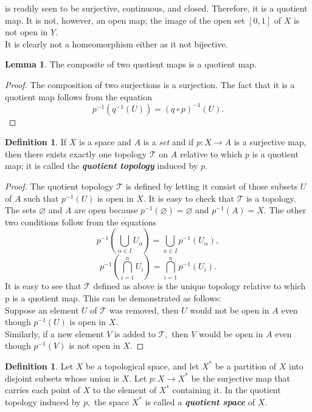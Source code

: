\documentclass{article}
\theoremstyle{definition}
\newtheorem{lem}[theorem]{Lemma}
\newtheorem{defn}[theorem]{Definition}
\let\emptyset\varnothing
\begin{document}
is readily seen to be surjective, continuous, and closed. Therefore, it is a quotient map. It is not, however, an open map; the image of the open set $[0, 1]$ of $X$ is not open in $Y.$\\
It is clearly not a homeomorphism either as it not bijective.
%
\begin{lem} \label{lem:compose quotients}
  The composite of two quotient maps is a quotient map.
\end{lem}
\begin{proof}
  The composition of two surjections is a surjection. The fact that it is a quotient map follows from the equation
  \[p^{-1}\left(q^{-1}(U)\right)=(q \circ p)^{-1}(U).\]
\end{proof}
%
\begin{defn} 
  If $X$ is a space and $A$ is a \emph{set} and if $p:X\longrightarrow A$ is a surjective map, then there exists exactly one topology $\mathcal{T}$ on $A$ relative to which $p$ is a quotient map; it is called the \textbf{\emph{quotient topology}} induced by $p.$
\end{defn}
\begin{proof}
  The quotient topology $\mathcal{T}$ is defined by letting it consist of those subsets $U$ of $A$ such that $p^{-1}(U)$ is open in $X.$ It is easy to check that $\mathcal{T}$ is a topology. The sets $\emptyset$ and $A$ are open because $p^{-1}(\emptyset) = \emptyset$ and $p^{-1}(A) = X.$ The other two conditions follow from the equations
  \[p^{-1}\left(\bigcup_{\alpha \in I} U_{\alpha}\right)=\bigcup_{\alpha \in I} p^{-1}\left(U_{\alpha}\right),\]
  \[p^{-1}\left(\bigcap_{i=1}^{n} U_{i}\right)=\bigcap_{i=1}^{n} p^{-1}\left(U_{i}\right).\]
  It is easy to see that $\mathcal{T}$ defined as above is the unique topology relative to which p is a quotient map. This can be demonstrated as follows:\\
  Suppose an element $U$ of $\mathcal{T}$ was removed, then $U$ would not be open in $A$ even though $p^{-1}(U)$ is open in $X.$\\
  Similarly, if a new element $V$ is added to $\mathcal{T},$ then $V$ would be open in $A$ even though $p^{-1}(V)$ is not open in $X.$
\end{proof}
%
\begin{defn} 
  Let $X$ be a topological space, and let $X^*$ be a partition of $X$ into disjoint subsets whose union is $X.$ Let $p:X\longrightarrow X^*$ be the surjective map that carries each point of $X$ to the element of $X^*$ containing it. In the quotient topology induced by $p,$ the space $X^*$ is called a \textbf{\emph{quotient space}} of $X.$
\end{defn}
\end{document}
